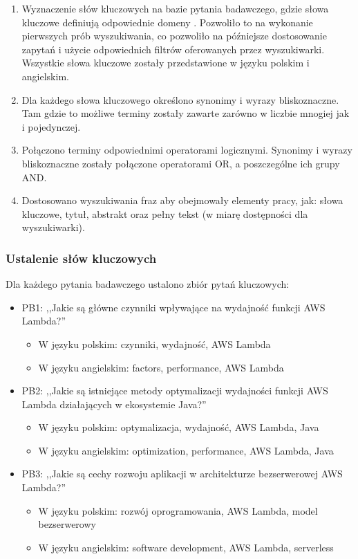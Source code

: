 \begin{enumerate}
    \item Wyznaczenie słów kluczowych na bazie pytania badawczego, gdzie słowa kluczowe definiują odpowiednie domeny \cite{doi:10.1177/0739456X17723971}.
    Pozwoliło to na wykonanie pierwszych prób wyszukiwania, co pozwoliło na późniejsze dostosowanie zapytań i użycie odpowiednich filtrów oferowanych przez wyszukiwarki.
    Wszystkie słowa kluczowe zostały przedstawione w języku polskim i angielskim.
    \item Dla każdego słowa kluczowego określono synonimy i wyrazy bliskoznaczne. Tam gdzie to możliwe terminy zostały zawarte zarówno w liczbie mnogiej jak i pojedynczej.
    \item Połączono terminy odpowiednimi operatorami logicznymi. Synonimy i wyrazy bliskoznaczne zostały połączone operatorami OR, a poszczególne ich grupy AND.
    \item Dostosowano wyszukiwania fraz aby obejmowały elementy pracy, jak: słowa kluczowe, tytuł, abstrakt oraz pełny tekst (w miarę dostępności dla wyszukiwarki).
\end{enumerate}

\subsubsection*{Ustalenie słów kluczowych}

Dla każdego pytania badawczego ustalono zbiór pytań kluczowych:

\begin{itemize}
    \item PB1: ,,Jakie są główne czynniki wpływające na wydajność funkcji AWS Lambda?''
    \begin{itemize}
        \item W języku polskim: czynniki, wydajność, AWS Lambda
        \item W języku angielskim: factors, performance, AWS Lambda
    \end{itemize}
    \item PB2: ,,Jakie są istniejące metody optymalizacji wydajności funkcji AWS Lambda działających w ekosystemie Java?''
    \begin{itemize}
        \item W języku polskim: optymalizacja, wydajność, AWS Lambda, Java
        \item W języku angielskim: optimization, performance, AWS Lambda, Java
    \end{itemize}
    \item PB3: ,,Jakie są cechy rozwoju aplikacji w architekturze bezserwerowej AWS Lambda?''
    \begin{itemize}
        \item W języku polskim: rozwój oprogramowania, AWS Lambda, model bezserwerowy
        \item W języku angielskim: software development, AWS Lambda, serverless
    \end{itemize}
\end{itemize}

